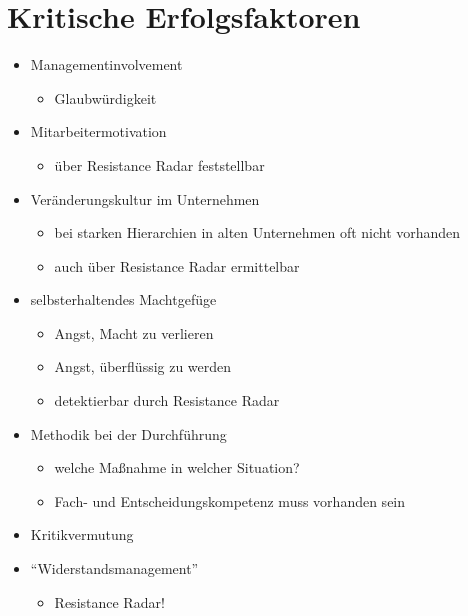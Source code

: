 \documentclass[a4paper, 12pt]{article}
\begin{document}
\section{Kritische Erfolgsfaktoren}
\begin{itemize}
  \item Managementinvolvement
    \begin{itemize}
      \item Glaubwürdigkeit
    \end{itemize}
  \item Mitarbeitermotivation
    \begin{itemize}
      \item über Resistance Radar feststellbar
    \end{itemize}
  \item Veränderungskultur im Unternehmen
    \begin{itemize}
      \item bei starken Hierarchien in alten Unternehmen oft nicht vorhanden
      \item auch über Resistance Radar ermittelbar
    \end{itemize}
  \item selbsterhaltendes Machtgefüge
    \begin{itemize}
      \item Angst, Macht zu verlieren
      \item Angst, überflüssig zu werden
      \item detektierbar durch Resistance Radar
    \end{itemize}
  \item Methodik bei der Durchführung
    \begin{itemize}
      \item welche Maßnahme in welcher Situation?
      \item Fach- und Entscheidungskompetenz muss vorhanden sein
    \end{itemize}
  \item Kritikvermutung
  \item ``Widerstandsmanagement''
    \begin{itemize}
      \item Resistance Radar!
    \end{itemize}
\end{itemize}
\end{document}
